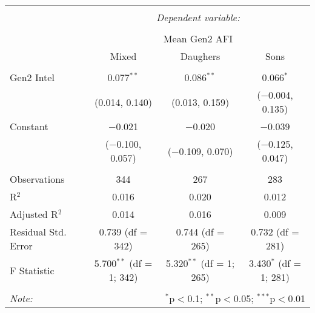 
\begingroup 
\small 
\begin{tabular}{@{\extracolsep{1pt}}lccc} 
\\[-1.8ex]\hline 
\hline \\[-1.8ex] 
 & \multicolumn{3}{c}{\textit{Dependent variable:}} \\ 
\cline{2-4} 
\\[-1.8ex] & \multicolumn{3}{c}{Mean Gen2 AFI} \\ 
 & Mixed & Daughers & Sons \\ 
\hline \\[-1.8ex] 
 Gen2 Intel & 0.077$^{**}$ & 0.086$^{**}$ & 0.066$^{*}$ \\ 
  & (0.014, 0.140) & (0.013, 0.159) & ($-$0.004, 0.135) \\ 
  Constant & $-$0.021 & $-$0.020 & $-$0.039 \\ 
  & ($-$0.100, 0.057) & ($-$0.109, 0.070) & ($-$0.125, 0.047) \\ 
 \hline \\[-1.8ex] 
Observations & 344 & 267 & 283 \\ 
R$^{2}$ & 0.016 & 0.020 & 0.012 \\ 
Adjusted R$^{2}$ & 0.014 & 0.016 & 0.009 \\ 
Residual Std. Error & 0.739 (df = 342) & 0.744 (df = 265) & 0.732 (df = 281) \\ 
F Statistic & 5.700$^{**}$ (df = 1; 342) & 5.320$^{**}$ (df = 1; 265) & 3.430$^{*}$ (df = 1; 281) \\ 
\hline 
\hline \\[-1.8ex] 
\textit{Note:}  & \multicolumn{3}{r}{$^{*}$p$<$0.1; $^{**}$p$<$0.05; $^{***}$p$<$0.01} \\ 
\end{tabular} 
\endgroup 

